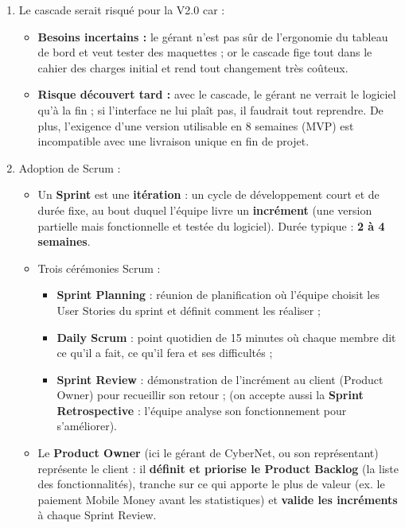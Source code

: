 \documentclass[11pt]{article}
\begin{document}
\begin{corrige}
\begin{enumerate}
    \item Le cascade serait risqué pour la V2.0 car :
    \begin{itemize}
        \item \textbf{Besoins incertains :} le gérant n'est pas sûr de l'ergonomie du tableau de bord et veut tester des maquettes ; or le cascade fige tout dans le cahier des charges initial et rend tout changement très coûteux.
        \item \textbf{Risque découvert tard :} avec le cascade, le gérant ne verrait le logiciel qu'à la fin ; si l'interface ne lui plaît pas, il faudrait tout reprendre. De plus, l'exigence d'une version utilisable en 8 semaines (MVP) est incompatible avec une livraison unique en fin de projet.
    \end{itemize}
    \item Adoption de Scrum :
    \begin{itemize}
        \item[a)] Un \textbf{Sprint} est une \textbf{itération} : un cycle de développement court et de durée fixe, au bout duquel l'équipe livre un \textbf{incrément} (une version partielle mais fonctionnelle et testée du logiciel). Durée typique : \textbf{2 à 4 semaines}.
        \item[b)] Trois cérémonies Scrum :
        \begin{itemize}
            \item \textbf{Sprint Planning} : réunion de planification où l'équipe choisit les User Stories du sprint et définit comment les réaliser ;
            \item \textbf{Daily Scrum} : point quotidien de 15 minutes où chaque membre dit ce qu'il a fait, ce qu'il fera et ses difficultés ;
            \item \textbf{Sprint Review} : démonstration de l'incrément au client (Product Owner) pour recueillir son retour ; (on accepte aussi la \textbf{Sprint Retrospective} : l'équipe analyse son fonctionnement pour s'améliorer).
        \end{itemize}
        \item[c)] Le \textbf{Product Owner} (ici le gérant de CyberNet, ou son représentant) représente le client : il \textbf{définit et priorise le Product Backlog} (la liste des fonctionnalités), tranche sur ce qui apporte le plus de valeur (ex. le paiement Mobile Money avant les statistiques) et \textbf{valide les incréments} à chaque Sprint Review.

\end{itemize}
\end{enumerate}
\end{corrige}
\end{document}
